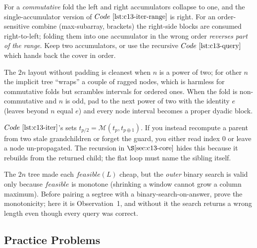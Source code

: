 \begin{warningbox}
For a \emph{commutative} fold the left and right accumulators collapse to one,
and the single-accumulator version of \(\coderef{c13-iter-range}\) is right.  For
an order-sensitive combine (max-subarray, brackets) the right-side blocks are
consumed right-to-left; folding them into one accumulator in the wrong order
\emph{reverses part of the range}.  Keep two accumulators, or use the recursive
\(\coderef{c13-query}\) which hands back the cover in order.
\end{warningbox}

\begin{warningbox}
The \(2n\) layout without padding is cleanest when \(n\) is a power of two; for
other \(n\) the implicit tree ``wraps'' a couple of ragged nodes, which is
harmless for commutative folds but scrambles intervals for ordered ones.  When
the fold is non-commutative and \(n\) is odd, pad to the next power of two with
the identity \(e\) (leaves beyond \(n\) equal \(e\)) and every node interval
becomes a proper dyadic block.
\end{warningbox}

\begin{warningbox}
\(\coderef{c13-iter}\)'s  sets \(t_{p/2}=\mathcal{M}(t_p,
t_{p\oplus 1})\).  If you instead recompute a parent from two stale grandchildren
or forget the  guard, you either read index \(0\) or leave a node
un-propagated.  The recursion in \(\secref{c13-core}\) hides this because it
rebuilds from the returned child; the flat loop must name the sibling itself.
\end{warningbox}

\begin{warningbox}
The \(2n\) tree made each \(\mathit{feasible}(L)\) cheap, but the \emph{outer}
binary search is valid only because \(\mathit{feasible}\) is monotone (shrinking a
window cannot grow a column maximum).  Before pairing a segtree with a
binary-search-on-answer, prove the monotonicity; here it is Observation~1, and
without it the search returns a wrong length even though every query was correct.
\end{warningbox}

\subsection{Practice Problems}

